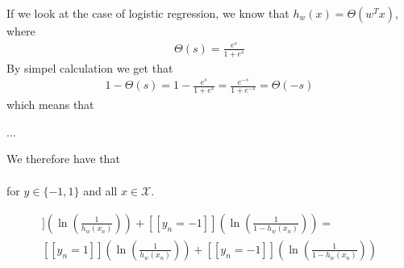 If we look at the case of logistic regression, we know that $h_w(x) = \Theta(w^T x)$, where
\begin{align}
\Theta(s) = \frac{e^s}{1+e^s}
\end{align}
By simpel calculation we get that
\begin{align}
1 - \Theta(s) = 1 - \frac{e^s}{1+e^s} = \frac{e^{-s}}{1+e^{-s}} = \Theta(-s)
\end{align}
which means that

...

We therefore have that
\begin{align}

\end{align}

for $y\in \{-1,1 \}$ and all $x\in \mathcal{X}$.

\begin{align}
[[y_n = 1]]\left(\ln \left( \frac{1}{h_w(x_n)}\right)\right) + [[y_n = -1]]\left(\ln \left( \frac{1}{1 - h_w(x_n)}\right)\right) = \\ 
[[y_n = 1]]\left(\ln \left( \frac{1}{h_w(x_n)}\right)\right) + [[y_n = -1]]\left(\ln \left( \frac{1}{1 - h_w(x_n)}\right)\right)
\end{align}